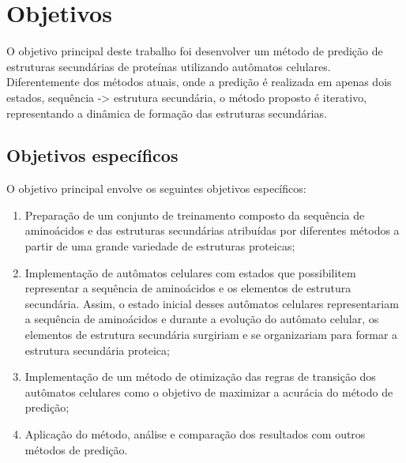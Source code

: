 \chapter{Objetivos}


O objetivo principal deste trabalho foi desenvolver um método de predição de estruturas secundárias de proteínas utilizando autômatos celulares. Diferentemente dos métodos atuais, onde a predição é realizada em apenas dois estados, sequência -> estrutura secundária, o método proposto é iterativo, representando a dinâmica de formação das estruturas secundárias. 



\section{Objetivos específicos}

O objetivo principal envolve os seguintes objetivos específicos:

\begin{enumerate}
	\item Preparação de um conjunto de treinamento composto da sequência de aminoácidos e das estruturas secundárias atribuídas por diferentes métodos a partir de uma grande variedade de estruturas proteicas;
	\item Implementação de autômatos celulares com estados que possibilitem representar a sequência de aminoácidos e os elementos de estrutura secundária. Assim, o estado inicial desses autômatos celulares representariam a sequência de aminoácidos e durante a evolução do autômato celular, os elementos de estrutura secundária surgiriam e se organizariam para formar a estrutura secundária proteica;
	\item Implementação de um método de otimização das regras de transição dos autômatos celulares como o objetivo de maximizar a acurácia do método de predição;
	\item Aplicação do método, análise e comparação dos resultados com outros métodos de predição.
\end{enumerate}

